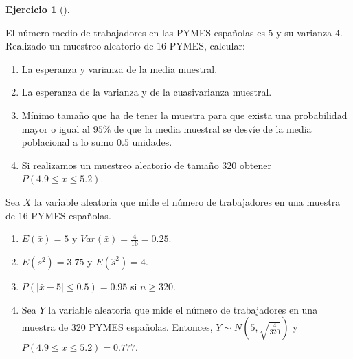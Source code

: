 \documentclass[
  spanish,
  a4paper,
]{scrreport}
\providecommand{\tightlist}{%
  \setlength{\itemsep}{0pt}\setlength{\parskip}{0pt}}
\theoremstyle{definition}
\newtheorem{exercise}{Ejercicio}[chapter]
\theoremstyle{remark}
\begin{document}
\begin{exercise}[]\protect\hypertarget{exr-distribución-media-trabajadores-pymes}{}\label{exr-distribución-media-trabajadores-pymes}

El número medio de trabajadores en las PYMES españolas es \(5\) y su
varianza \(4\). Realizado un muestreo aleatorio de \(16\) PYMES,
calcular:

\begin{enumerate}
\def\labelenumi{\alph{enumi}.}
\item
  La esperanza y varianza de la media muestral.
\item
  La esperanza de la varianza y de la cuasivarianza muestral.
\item
  Mínimo tamaño que ha de tener la muestra para que exista una
  probabilidad mayor o igual al \(95\)\% de que la media muestral se
  desvíe de la media poblacional a lo sumo \(0.5\) unidades.
\item
  Si realizamos un muestreo aleatorio de tamaño \(320\) obtener
  \(P(4.9\leq \bar x  \leq 5.2)\).
\end{enumerate}

\end{exercise}

\begin{tcolorbox}[enhanced jigsaw, arc=.35mm, bottomrule=.15mm, bottomtitle=1mm, breakable, colback=white, colbacktitle=quarto-callout-tip-color!10!white, colframe=quarto-callout-tip-color-frame, coltitle=black, left=2mm, leftrule=.75mm, opacityback=0, opacitybacktitle=0.6, rightrule=.15mm, title=\textcolor{quarto-callout-tip-color}{\faLightbulb}\hspace{0.5em}{Solución}, titlerule=0mm, toprule=.15mm, toptitle=1mm]

Sea \(X\) la variable aleatoria que mide el número de trabajadores en
una muestra de 16 PYMES españolas.

\begin{enumerate}
\def\labelenumi{\alph{enumi}.}
\tightlist
\item
  \(E(\bar x) = 5\) y \(Var(\bar x) = \frac{4}{16} = 0.25\).
\item
  \(E(s^2) = 3.75\) y \(E(\hat s^2) = 4\).
\item
  \(P(|\bar x - 5| \leq 0.5) = 0.95\) si \(n\geq 320\).
\item
  Sea \(Y\) la variable aleatoria que mide el número de trabajadores en
  una muestra de 320 PYMES españolas. Entonces,
  \(Y\sim N\left(5, \sqrt{\frac{4}{320}}\right)\) y
  \(P(4.9\leq \bar x  \leq 5.2) = 0.777\).
\end{enumerate}

\end{tcolorbox}
\end{document}
